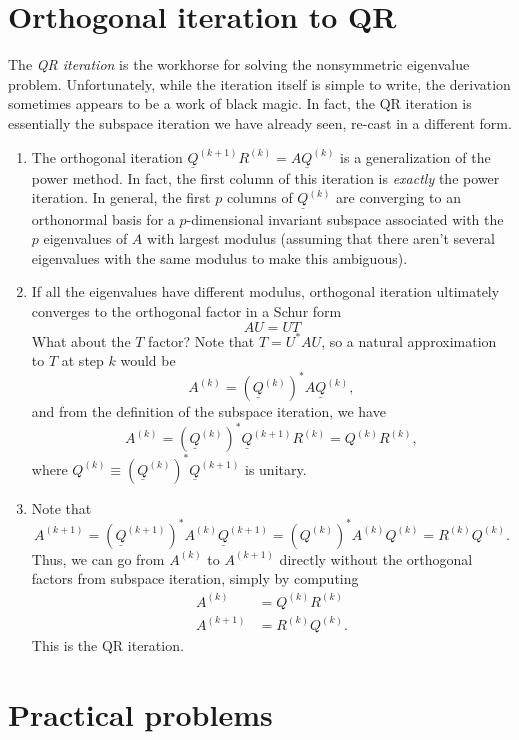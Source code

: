 \documentclass[12pt, leqno]{article} %
\newcommand{\uQ}{\underline{Q}}
\begin{document}

\section{Orthogonal iteration to QR}

The {\em QR iteration} is the workhorse for solving the nonsymmetric
eigenvalue problem.  Unfortunately, while the iteration itself is
simple to write, the derivation sometimes appears to be a work of
black magic.  In fact, the QR iteration is essentially the subspace
iteration we have already seen, re-cast in a different form.

\begin{enumerate}
\item
  The orthogonal iteration $\uQ^{(k+1)} R^{(k)} = A \uQ^{(k)}$ is a
  generalization of the power method.  In fact, the first column of
  this iteration is {\em exactly} the power iteration.  In general,
  the first $p$ columns of $\uQ^{(k)}$ are converging to an orthonormal
  basis for a $p$-dimensional invariant subspace associated with the
  $p$ eigenvalues of $A$ with largest modulus (assuming that there
  aren't several eigenvalues with the same modulus to make this
  ambiguous).
\item
  If all the eigenvalues have different modulus, orthogonal iteration
  ultimately converges to the orthogonal factor in a Schur form
  \[
    AU = UT
  \]
  What about the $T$ factor?  Note that $T = U^* A U$, so a natural
  approximation to $T$ at step $k$ would be
  \[
    A^{(k)} = (\uQ^{(k)})^* A \uQ^{(k)},
  \]
  and from the definition of the subspace iteration, we have
  \[
    A^{(k)} = (\uQ^{(k)})^* \uQ^{(k+1)} R^{(k)} = Q^{(k)} R^{(k)},
  \]
  where $Q^{(k)} \equiv (\uQ^{(k)})^* \uQ^{(k+1)}$ is unitary.
\item
  Note that
  \[
    A^{(k+1)}
    = (\uQ^{(k+1)})^* A^{(k)} \uQ^{(k+1)}
    = (Q^{(k)})^* A^{(k)} Q^{(k)}
    = R^{(k)} Q^{(k)}.
  \]
  Thus, we can go from $A^{(k)}$ to $A^{(k+1)}$ directly without
  the orthogonal factors from subspace iteration, simply by computing
  \begin{align*}
    A^{(k)} &= Q^{(k)} R^{(k)} \\
    A^{(k+1)} &= R^{(k)} Q^{(k)}.
  \end{align*}
  This is the QR iteration.
\end{enumerate}

\section{Practical problems}
\end{document}

